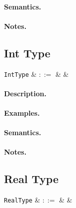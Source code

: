 \paragraph{Semantics.}

\paragraph{Notes.} 


\subsection{Int Type}

\begin{syntax}
  \verb+IntType+ & $::=$ &  &\\
\end{syntax}

\paragraph{Description.}

\paragraph{Examples.}

\paragraph{Semantics.}

\paragraph{Notes.} 


\subsection{Real Type}

\begin{syntax}
  \verb+RealType+ & $::=$ &  &\\
\end{syntax}

